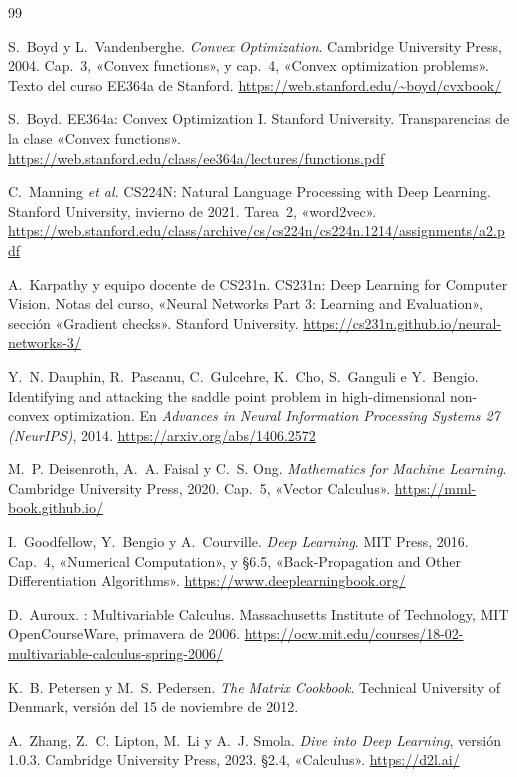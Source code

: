\begin{thebibliography}{99}
\small

S.~Boyd y L.~Vandenberghe.
\newblock \emph{Convex Optimization}.
\newblock Cambridge University Press, 2004.
\newblock Cap.~3, «Convex functions», y cap.~4, «Convex optimization problems». Texto del curso EE364a de Stanford.
\newblock \url{https://web.stanford.edu/~boyd/cvxbook/}

S.~Boyd.
\newblock EE364a: Convex Optimization I.
\newblock Stanford University. Transparencias de la clase «Convex functions».
\newblock \url{https://web.stanford.edu/class/ee364a/lectures/functions.pdf}

C.~Manning \emph{et al.}
\newblock CS224N: Natural Language Processing with Deep Learning.
\newblock Stanford University, invierno de 2021. Tarea~2, «word2vec».
\newblock \url{https://web.stanford.edu/class/archive/cs/cs224n/cs224n.1214/assignments/a2.pdf}

A.~Karpathy y equipo docente de CS231n.
\newblock CS231n: Deep Learning for Computer Vision. Notas del curso, «Neural Networks Part 3: Learning and Evaluation», sección «Gradient checks».
\newblock Stanford University.
\newblock \url{https://cs231n.github.io/neural-networks-3/}

Y.~N. Dauphin, R.~Pascanu, C.~Gulcehre, K.~Cho, S.~Ganguli e Y.~Bengio.
\newblock Identifying and attacking the saddle point problem in high-dimensional non-convex optimization.
\newblock En \emph{Advances in Neural Information Processing Systems 27 (NeurIPS)}, 2014.
\newblock \url{https://arxiv.org/abs/1406.2572}

M.~P. Deisenroth, A.~A. Faisal y C.~S. Ong.
\newblock \emph{Mathematics for Machine Learning}.
\newblock Cambridge University Press, 2020.
\newblock Cap.~5, «Vector Calculus».
\newblock \url{https://mml-book.github.io/}

I.~Goodfellow, Y.~Bengio y A.~Courville.
\newblock \emph{Deep Learning}.
\newblock MIT Press, 2016.
\newblock Cap.~4, «Numerical Computation», y §6.5, «Back-Propagation and Other Differentiation Algorithms».
\newblock \url{https://www.deeplearningbook.org/}

D.~Auroux.
: Multivariable Calculus.
\newblock Massachusetts Institute of Technology, MIT OpenCourseWare, primavera de 2006.
\newblock \url{https://ocw.mit.edu/courses/18-02-multivariable-calculus-spring-2006/}

K.~B. Petersen y M.~S. Pedersen.
\newblock \emph{The Matrix Cookbook}.
\newblock Technical University of Denmark, versión del 15 de noviembre de 2012.

A.~Zhang, Z.~C. Lipton, M.~Li y A.~J. Smola.
\newblock \emph{Dive into Deep Learning}, versión 1.0.3.
\newblock Cambridge University Press, 2023.
\newblock §2.4, «Calculus».
\newblock \url{https://d2l.ai/}

\end{thebibliography}
